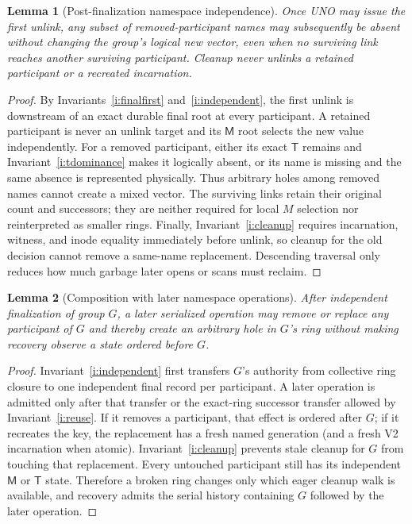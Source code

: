 \documentclass[10pt,twocolumn]{article}
\newtheorem{lemma}{Lemma}
\theoremstyle{remark}
\newcommand{\Materialized}{\mathsf{M}}
\newcommand{\Tombstone}{\mathsf{T}}
\begin{document}
\begin{lemma}[Post-finalization namespace independence]\label{lem:delete}
Once UNO may issue the first unlink, any subset of removed-participant names may subsequently be
absent without changing the group's logical new vector, even when no surviving link reaches another
surviving participant. Cleanup never unlinks a retained participant or a recreated incarnation.
\end{lemma}
\begin{proof}
By Invariants~\ref{i:finalfirst} and~\ref{i:independent}, the first unlink is downstream of an exact
durable final root at every participant. A retained participant is never an unlink target and its
$\Materialized$ root selects the new value independently. For a removed participant, either its
exact $\Tombstone$ remains and Invariant~\ref{i:tdominance} makes it logically absent, or its name is
missing and the same absence is represented physically. Thus arbitrary holes among removed names
cannot create a mixed vector. The surviving links retain their original count and successors; they
are neither required for local $M$ selection nor reinterpreted as smaller rings. Finally,
Invariant~\ref{i:cleanup} requires incarnation, witness, and
inode equality immediately before unlink, so cleanup for the old decision cannot remove a same-name
replacement. Descending traversal only reduces how much garbage later opens or scans must reclaim.
\end{proof}

\begin{lemma}[Composition with later namespace operations]\label{lem:composition}
After independent finalization of group $G$, a later serialized operation may remove or replace any
participant of $G$ and thereby create an arbitrary hole in $G$'s ring without making recovery
observe a state ordered before $G$.
\end{lemma}
\begin{proof}
Invariant~\ref{i:independent} first transfers $G$'s authority from collective ring closure to one
independent final record per participant. A later operation is admitted only after that transfer or
the exact-ring successor transfer allowed by Invariant~\ref{i:reuse}. If it removes a participant,
that effect is ordered after $G$; if it recreates the key, the replacement has a fresh named
generation (and a fresh V2 incarnation when atomic).
Invariant~\ref{i:cleanup} prevents stale cleanup for $G$ from touching that replacement. Every
untouched participant still has its independent $\Materialized$ or $\Tombstone$ state. Therefore a
broken ring changes only which eager cleanup walk is available, and recovery admits the serial
history containing $G$ followed by the later operation.
\end{proof}
\end{document}
